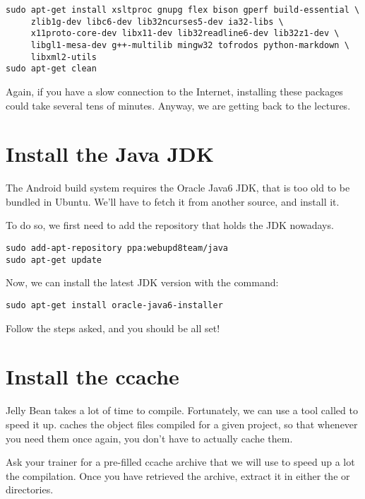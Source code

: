 \begin{verbatim}
sudo apt-get install xsltproc gnupg flex bison gperf build-essential \
     zlib1g-dev libc6-dev lib32ncurses5-dev ia32-libs \
     x11proto-core-dev libx11-dev lib32readline6-dev lib32z1-dev \
     libgl1-mesa-dev g++-multilib mingw32 tofrodos python-markdown \
     libxml2-utils
sudo apt-get clean
\end{verbatim}

Again, if you have a slow connection to the Internet, installing these
packages could take several tens of minutes. Anyway, we are getting
back to the lectures.

\section{Install the Java JDK}

The Android build system requires the Oracle Java6 JDK, that is too
old to be bundled in Ubuntu. We'll have to fetch it from another
source, and install it.

To do so, we first need to add the repository that holds the JDK
nowadays.

\begin{verbatim}
sudo add-apt-repository ppa:webupd8team/java
sudo apt-get update
\end{verbatim}

Now, we can install the latest JDK version with the command:
\begin{verbatim}
sudo apt-get install oracle-java6-installer
\end{verbatim}

Follow the steps asked, and you should be all set!

\section{Install the ccache}

Jelly Bean takes a lot of time to compile. Fortunately, we can use a
tool called  to speed it up.  caches the
object files compiled for a given project, so that whenever you need
them once again, you don't have to actually cache them.

Ask your trainer for a pre-filled ccache archive that we will use to
speed up a lot the compilation. Once you have retrieved the archive,
extract it in either the \code{/opt/} or 
directories.
